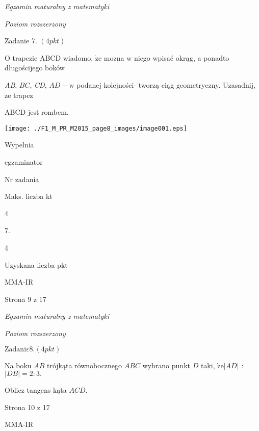 \documentclass[a4paper,12pt]{article}
\begin{document}
{\it Egzamin maturalny z matematyki}

{\it Poziom rozszerzony}

Zadanie 7. $(4pkt)$

$\mathrm{O}$ trapezie ABCD wiadomo, $\dot{\mathrm{z}}\mathrm{e}$ mozna w niego wpisać okrąg, a ponadto długościjego boków

{\it AB}, $BC$, {\it CD}, $AD-\mathrm{w}$ podanej kolejności- tworzą ciąg geometryczny. Uzasadnij, $\dot{\mathrm{z}}\mathrm{e}$ trapez

ABCD jest rombem.
\begin{center}
\texttt{[image: ./F1\_M\_PR\_M2015\_page8\_images/image001.eps]}
\end{center}
Wypelnia

egzaminator

Nr zadania

Maks. liczba kt

4

7.

4

Uzyskana liczba pkt

MMA-IR

Strona 9 z 17





{\it Egzamin maturalny z matematyki}

{\it Poziom rozszerzony}

$\mathrm{Z}\mathrm{a}\mathrm{d}\mathrm{a}\mathrm{n}\mathrm{i}\varepsilon 8. (4pkt)$

Na boku $AB$ trójkąta równobocznego $ABC$ wybrano punkt $D$ taki, $\dot{\mathrm{z}}\mathrm{e}|AD|$ : $|DB|=2:3.$

Oblicz tangens kąta $ACD.$

Strona 10 z 17

MMA-IR
\end{document}
